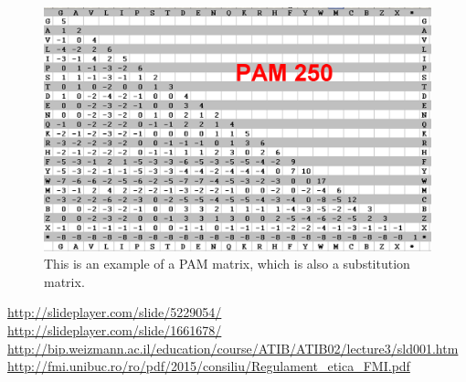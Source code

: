 \documentclass[paper=a4, fontsize=11pt]{scrartcl} %
\numberwithin{equation}{section} %
\numberwithin{figure}{section} %
\numberwithin{table}{section} %
\begin{document}
\newpage
\paragraph{}
\begin{figure}[h!]
  \includegraphics[width=\linewidth]{pam250.png}
 	This is an example of a PAM matrix, which is also a substitution matrix.
  \label{fig:boat1}
\end{figure}

\newpage
{\small
\begin{thebibliography}{9999}

\url {http://slideplayer.com/slide/5229054/}\\

\url {http://slideplayer.com/slide/1661678/}\\

\url {http://bip.weizmann.ac.il/education/course/ATIB/ATIB02/lecture3/sld001.htm}\\

\url {http://fmi.unibuc.ro/ro/pdf/2015/consiliu/Regulament_etica_FMI.pdf}\\


\end{thebibliography}
}



\end{document}
